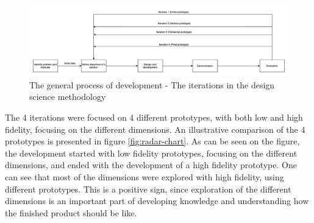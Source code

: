 \documentclass[pdftex,10pt,b5paper,twoside]{report}
\begin{document}
\begin{figure}[h!]
    \centering
    \includegraphics[width=\linewidth]{../images/workflow.png}
    \caption{The general process of development - The iterations in the design science methodology}
    \label{fig:workflow}
\end{figure}

The 4 iterations were focused on 4 different prototypes, with both low and high fidelity, focusing on the different dimensions. An illustrative comparison of the 4 prototypes is presented in figure \ref{fig:radar-chart}. As can be seen on the figure, the development started with low fidelity prototypes, focusing on the different dimensions, and ended with the development of a high fidelity prototype. One can see that most of the dimensions were explored with high fidelity, using different prototypes. This is a positive sign, since exploration of the different dimensions is an important part of developing knowledge and understanding how the finished product should be like. 
\end{document}
